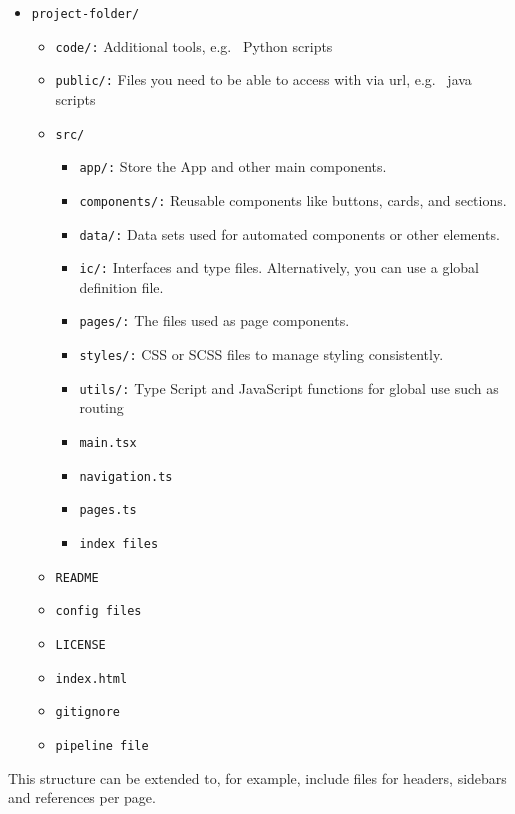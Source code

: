 \begin{itemize}
    \item \texttt{project-folder/}
    \begin{itemize}
        \item \texttt{code/:} Additional tools, e.g. \ Python scripts
        \item \texttt{public/:} Files you need to be able to access with via url, e.g. \ java scripts
        \item \texttt{src/}
        \begin{itemize}
            \item \texttt{app/:} Store the App and other main components.
            \item \texttt{components/:} Reusable components like buttons, cards, and sections.
            \item \texttt{data/:} Data sets used for automated components or other elements.
            \item \texttt{ic/:} Interfaces and type files. %
            Alternatively, you can use a global definition file.
            \item \texttt{pages/:} The files used as page components.
            \item \texttt{styles/:} CSS or SCSS files to manage styling consistently.
            \item \texttt{utils/:} Type Script and JavaScript functions for global use such as routing
            \item \texttt{main.tsx}
            \item \texttt{navigation.ts}
            \item \texttt{pages.ts}
            \item \texttt{index files}
        \end{itemize}
        \item \texttt{README}
        \item \texttt{config files} %
        \item \texttt{LICENSE}
        \item \texttt{index.html}
        \item \texttt{gitignore}
        \item \texttt{pipeline file}
    \end{itemize}
\end{itemize}
This structure can be extended to, for example, include files for headers, sidebars and references per page.

